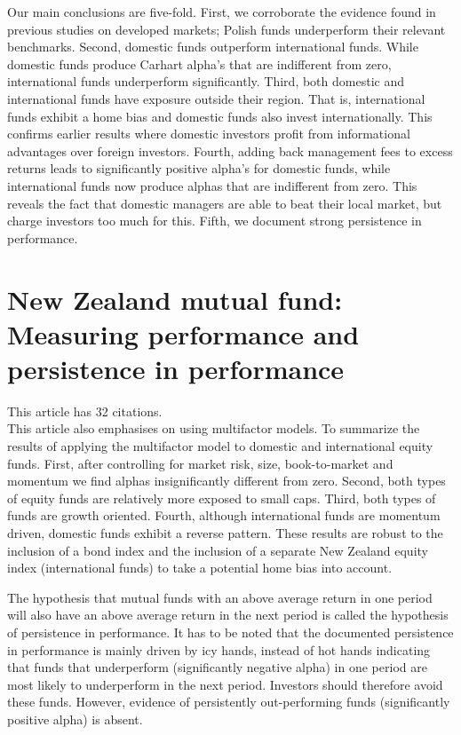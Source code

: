 \documentclass[12 pt]{article}
\begin{document}
\par Our main conclusions are five-fold. First, we corroborate the evidence found in previous studies on developed markets; Polish funds underperform their relevant benchmarks. Second, domestic funds outperform international funds. While domestic funds produce Carhart alpha's that are indifferent from zero, international funds underperform significantly. Third, both domestic and international funds have exposure outside their region. That is, international funds exhibit a home bias and domestic funds also invest internationally. This confirms earlier results where domestic investors profit from informational advantages over foreign investors. Fourth, adding back management fees to excess returns leads to significantly positive alpha's for domestic funds, while international funds now produce alphas that are indifferent from zero. This reveals the fact that domestic managers are able to beat their local market, but charge investors too much for this. Fifth, we document strong persistence in performance. 
\section{New Zealand mutual fund: Measuring performance and persistence in performance}
This article has 32 citations. \\
This article also emphasises on using multifactor models. To summarize the results of applying the multifactor model to domestic and international equity funds. First, after controlling for market risk, size, book-to-market and momentum we find alphas insignificantly different from zero. Second, both types of equity funds are relatively more exposed to small caps. Third, both types of funds are growth oriented. Fourth, although international funds are momentum driven, domestic funds exhibit a reverse pattern. These results are robust to the inclusion of a bond index and the inclusion of a separate New Zealand equity index (international funds) to take a potential home bias into account.
\par The hypothesis that mutual funds with an above average return in one period will also have an above average return in the next period is called the hypothesis of persistence in performance. It has to be noted that the documented persistence in performance is mainly
driven by icy hands, instead of hot hands indicating that funds that underperform (significantly negative alpha) in one period are most likely to underperform in the next period. Investors should therefore avoid these funds. However, evidence of persistently out-performing funds (significantly positive alpha) is absent. 
\end{document}
